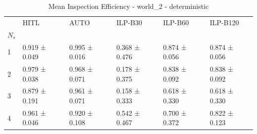 \begin{table}
\caption{Mean Inspection Efficiency - world_2 - deterministic}
\label{tab:inspection_efficiency_deterministic}
\begin{tabular}{llllll}
\toprule
 & HITL & AUTO & ILP-B30 & ILP-B60 & ILP-B120 \\
$N_s$ &  &  &  &  &  \\
\midrule
1 & 0.919 ± 0.049 & 0.995 ± 0.016 & 0.368 ± 0.476 & 0.874 ± 0.056 & 0.874 ± 0.056 \\
2 & 0.979 ± 0.038 & 0.968 ± 0.071 & 0.178 ± 0.375 & 0.838 ± 0.092 & 0.838 ± 0.092 \\
3 & 0.879 ± 0.191 & 0.961 ± 0.071 & 0.158 ± 0.333 & 0.618 ± 0.330 & 0.618 ± 0.330 \\
4 & 0.961 ± 0.046 & 0.920 ± 0.108 & 0.542 ± 0.467 & 0.700 ± 0.372 & 0.822 ± 0.123 \\
\bottomrule
\end{tabular}
\end{table}
